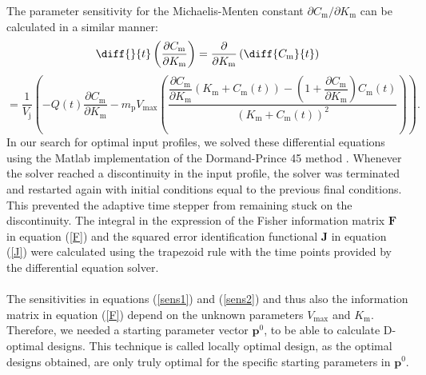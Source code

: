 The parameter sensitivity for the Michaelis-Menten constant  $\partial C_\text{m}/\partial K_{\text{m}}$ can be calculated in a similar manner:
\begin{equation}
\diff{}{t}\left(\dfrac{\partial C_\text{m}}{\partial K_{\text{m}}}\right) = 
\dfrac{\partial}{\partial K_{\text{m}}}\left(\diff{C_\text{m}}{t}\right)
\label{sens2}
\end{equation}
\begin{equation*}
=
\frac{ 1}{V_\text{j}} \left(-Q(t)\dfrac{\partial C_\text{m}}{\partial K_{\text{m}}} 
- m_\text{p}V_{\text{max}}\left(\frac{  \dfrac{\partial C_\text{m}}{\partial K_{\text{m}}}\left(K_\text{m} + C_\text{m}(t)\right) - \left(1 + \dfrac{\partial C_\text{m}}{\partial K_{\text{m}}}\right)C_\text{m}(t)}{(K_\text{m} + C_\text{m}(t))^2}
\right)\right).
\end{equation*}
In our search for optimal input profiles, we solved these differential equations using the Matlab implementation of the Dormand-Prince 45 method \parencite{matlab1}. Whenever the solver reached a discontinuity in the input profile, the solver was  terminated and restarted again with initial conditions equal to the previous final conditions. This prevent{ed} the adaptive time stepper from remaining stuck on the discontinuity. The integral in the expression of the Fisher information matrix $\mathbf{F}$ in equation (\ref{F}) and the squared error identification functional $\mathbf{J}$ in equation (\ref{J}) were  calculated using the trapezoid rule with the time points provided by the differential equation solver. 
\\
\\
The sensitivities in equations (\ref{sens1}) and (\ref{sens2}) and thus also the information matrix in equation (\ref{F}) depend on the unknown parameters $V_{\text{max}}$ and $K_{\text{m}}$. Therefore, we needed a starting parameter vector $\mathbf{p}^0$, to be able to calculate D-optimal designs. This technique is called locally optimal design, as the optimal designs obtained, are only truly optimal for the specific starting parameters in $\mathbf{p}^0$.
